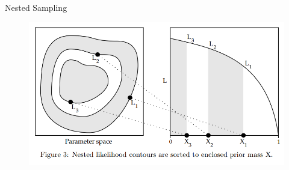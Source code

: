 \begin{frame}[t]{Nested Sampling}


\begin{figure}
\begin{center}
\includegraphics[scale=0.2]{ns.png}
\end{center}
\end{figure}

\end{frame}

